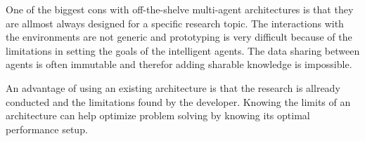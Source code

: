 
One of the biggest cons with off-the-shelve multi-agent architectures is that they are allmost
always designed for a specific research topic. The interactions with the environments are not generic 
and prototyping is very difficult because of the limitations in setting the goals of the intelligent 
agents. The data sharing between agents is often immutable and therefor adding sharable knowledge is impossible. 


An advantage of using an existing architecture is that the research is allready conducted and the limitations found 
by the developer. Knowing the limits of an architecture can help optimize problem solving by knowing its optimal 
performance setup.